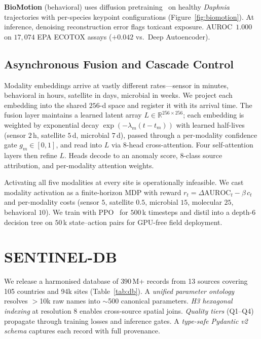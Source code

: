 \documentclass{article}
\begin{document}
\textbf{BioMotion} (behavioral) uses diffusion pretraining~\citep{ho2020ddpm} on healthy \emph{Daphnia} trajectories with per-species keypoint configurations (Figure~\ref{fig:biomotion}). At inference, denoising reconstruction error flags toxicant exposure. AUROC~$1.000$ on $17{,}074$ EPA ECOTOX assays ($+0.042$ vs.\ Deep Autoencoder).

\subsection{Asynchronous Fusion and Cascade Control}
\label{sec:fusion}

Modality embeddings arrive at vastly different rates---sensor in minutes, behavioral in hours, satellite in days, microbial in weeks. We project each embedding into the shared $256$-d space and register it with its arrival time. The fusion layer maintains a learned latent array $L\!\in\!\mathbb{R}^{256\times 256}$; each embedding is weighted by exponential decay $\exp(-\lambda_m(t\!-\!t_m))$ with learned half-lives (sensor $2$\,h, satellite $5$\,d, microbial $7$\,d), passed through a per-modality confidence gate $g_m\!\in\![0,1]$, and read into $L$ via 8-head cross-attention. Four self-attention layers then refine $L$. Heads decode to an anomaly score, 8-class source attribution, and per-modality attention weights.

Activating all five modalities at every site is operationally infeasible. We cast modality activation as a finite-horizon MDP with reward $r_t\!=\!\Delta\mathrm{AUROC}_t - \beta\,c_t$ and per-modality costs (sensor $5$, satellite $0.5$, microbial $15$, molecular $25$, behavioral $10$). We train with PPO~\citep{schulman2017ppo} for $500$\,k timesteps and distil into a depth-6 decision tree on $50$\,k state--action pairs for GPU-free field deployment.

\section{SENTINEL-DB}
\label{sec:db}

We release a harmonised database of $390$\,M+ records from 13 sources covering 105 countries and 94k sites (Table~\ref{tab:db}). A \emph{unified parameter ontology} resolves $>$10k raw names into $\sim$500 canonical parameters. \emph{H3 hexagonal indexing} at resolution 8 enables cross-source spatial joins. \emph{Quality tiers} (Q1--Q4) propagate through training losses and inference gates. A \emph{type-safe Pydantic v2 schema} captures each record with full provenance.
\end{document}
